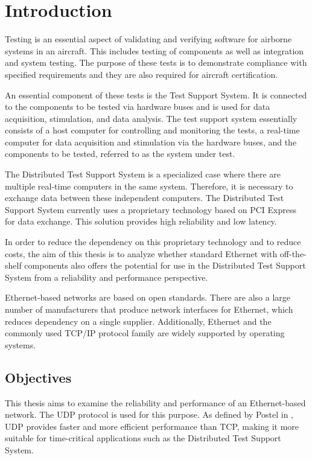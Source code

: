 \chapter{Introduction} \label{chap:introduction}
Testing is an essential aspect of validating and verifying software for airborne systems in an aircraft. This includes testing of components as well as integration and system testing. The purpose of these tests is to demonstrate compliance with specified requirements and they are also required for aircraft certification.

An essential component of these tests is the Test Support System. It is connected to the components to be tested via hardware buses and is used for data acquisition, stimulation, and data analysis. The test support system essentially consists of a host computer for controlling and monitoring the tests, a real-time computer for data acquisition and stimulation via the hardware buses, and the components to be tested, referred to as the system under test.

The Distributed Test Support System is a specialized case where there are multiple real-time computers in the same system. Therefore, it is necessary to exchange data between these independent computers. The Distributed Test Support System currently uses a proprietary technology based on PCI Express for data exchange. This solution provides high reliability and low latency.

In order to reduce the dependency on this proprietary technology and to reduce costs, the aim of this thesis is to analyze whether standard Ethernet with off-the-shelf components also offers the potential for use in the Distributed Test Support System from a reliability and performance perspective.

Ethernet-based networks are based on open standards. There are also a large number of manufacturers that produce network interfaces for Ethernet, which reduces dependency on a single supplier. Additionally, Ethernet and the commonly used TCP/IP protocol family are widely supported by operating systems.


\section{Objectives} \label{chap:introduction:research_questions}
This thesis aims to examine the reliability and performance of an Ethernet-based network. The UDP protocol is used for this purpose. As defined by Postel in \cite{introRelW04}, UDP provides faster and more efficient performance than TCP, making it more suitable for time-critical applications such as the Distributed Test Support System.

